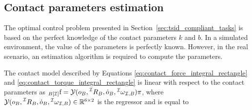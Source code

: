 \subsection{Contact parameters estimation}
The optimal control problem presented in Section~\ref{sec:tsid_compliant_tasks} is based on the perfect knowledge of the contact parameters $k$ and $b$. In a simulated environment, the value of the parameters is perfectly known. However, in the real scenario, an estimation algorithm is required to compute the parameters.
\par
The contact model described by Equations \eqref{eq:contact_force_integral_rectangle} and \eqref{eq:contact_torque_integral_rectangle} is linear with respect to the contact parameters as $ {}_{B[\mathcal{I}]} \mathrm{f}  = \mathcal{Y}(o_B, \prescript{\mathcal{I}}{} R _ B, \dot{o}_B, \prescript{\mathcal{I}}{} \omega _ {\mathcal{I}, B}) \pi$,
where $\mathcal{Y}(o_B, \prescript{\mathcal{I}}{} R _ B, \dot{o}_B, \prescript{\mathcal{I}}{} \omega _ {\mathcal{I}, B})  \in \mathbb{R} ^{6 \times 2}$ is the regressor and is equal to 



